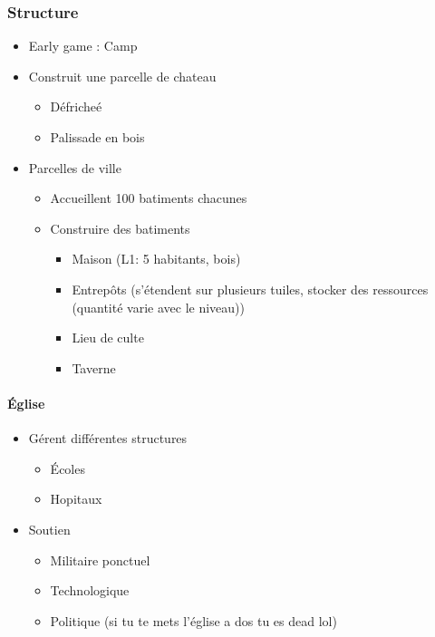 \documentclass[
]{article}
\providecommand{\tightlist}{%
  \setlength{\itemsep}{0pt}\setlength{\parskip}{0pt}}
\begin{document}
\hypertarget{structure}{%
\subsubsection{Structure}\label{structure}}

\begin{itemize}
\tightlist
\item
  Early game : Camp
\item
  Construit une parcelle de chateau

  \begin{itemize}
  \tightlist
  \item
    Défricheé
  \item
    Palissade en bois
  \end{itemize}
\item
  Parcelles de ville

  \begin{itemize}
  \tightlist
  \item
    Accueillent 100 batiments chacunes
  \item
    Construire des batiments

    \begin{itemize}
    \tightlist
    \item
      Maison (L1: 5 habitants, bois)
    \item
      Entrepôts (s'étendent sur plusieurs tuiles, stocker des ressources
      (quantité varie avec le niveau))
    \item
      Lieu de culte
    \item
      Taverne
    \end{itemize}
  \end{itemize}
\end{itemize}

\hypertarget{uxe9glise}{%
\paragraph{Église}\label{uxe9glise}}

\begin{itemize}
\tightlist
\item
  Gérent différentes structures

  \begin{itemize}
  \tightlist
  \item
    Écoles
  \item
    Hopitaux
  \end{itemize}
\item
  Soutien

  \begin{itemize}
  \tightlist
  \item
    Militaire ponctuel
  \item
    Technologique
  \item
    Politique (si tu te mets l'église a dos tu es dead lol)
  \end{itemize}
\end{itemize}
\end{document}
